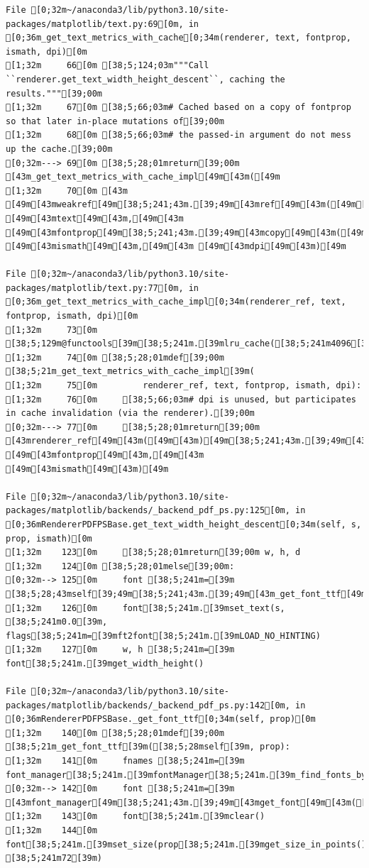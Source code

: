\documentclass[
  letterpaper,
  DIV=11,
  numbers=noendperiod]{scrartcl}
\begin{document}
\begin{verbatim}
File [0;32m~/anaconda3/lib/python3.10/site-packages/matplotlib/text.py:69[0m, in [0;36m_get_text_metrics_with_cache[0;34m(renderer, text, fontprop, ismath, dpi)[0m
[1;32m     66[0m [38;5;124;03m"""Call ``renderer.get_text_width_height_descent``, caching the results."""[39;00m
[1;32m     67[0m [38;5;66;03m# Cached based on a copy of fontprop so that later in-place mutations of[39;00m
[1;32m     68[0m [38;5;66;03m# the passed-in argument do not mess up the cache.[39;00m
[0;32m---> 69[0m [38;5;28;01mreturn[39;00m [43m_get_text_metrics_with_cache_impl[49m[43m([49m
[1;32m     70[0m [43m    [49m[43mweakref[49m[38;5;241;43m.[39;49m[43mref[49m[43m([49m[43mrenderer[49m[43m)[49m[43m,[49m[43m [49m[43mtext[49m[43m,[49m[43m [49m[43mfontprop[49m[38;5;241;43m.[39;49m[43mcopy[49m[43m([49m[43m)[49m[43m,[49m[43m [49m[43mismath[49m[43m,[49m[43m [49m[43mdpi[49m[43m)[49m

File [0;32m~/anaconda3/lib/python3.10/site-packages/matplotlib/text.py:77[0m, in [0;36m_get_text_metrics_with_cache_impl[0;34m(renderer_ref, text, fontprop, ismath, dpi)[0m
[1;32m     73[0m [38;5;129m@functools[39m[38;5;241m.[39mlru_cache([38;5;241m4096[39m)
[1;32m     74[0m [38;5;28;01mdef[39;00m [38;5;21m_get_text_metrics_with_cache_impl[39m(
[1;32m     75[0m         renderer_ref, text, fontprop, ismath, dpi):
[1;32m     76[0m     [38;5;66;03m# dpi is unused, but participates in cache invalidation (via the renderer).[39;00m
[0;32m---> 77[0m     [38;5;28;01mreturn[39;00m [43mrenderer_ref[49m[43m([49m[43m)[49m[38;5;241;43m.[39;49m[43mget_text_width_height_descent[49m[43m([49m[43mtext[49m[43m,[49m[43m [49m[43mfontprop[49m[43m,[49m[43m [49m[43mismath[49m[43m)[49m

File [0;32m~/anaconda3/lib/python3.10/site-packages/matplotlib/backends/_backend_pdf_ps.py:125[0m, in [0;36mRendererPDFPSBase.get_text_width_height_descent[0;34m(self, s, prop, ismath)[0m
[1;32m    123[0m     [38;5;28;01mreturn[39;00m w, h, d
[1;32m    124[0m [38;5;28;01melse[39;00m:
[0;32m--> 125[0m     font [38;5;241m=[39m [38;5;28;43mself[39;49m[38;5;241;43m.[39;49m[43m_get_font_ttf[49m[43m([49m[43mprop[49m[43m)[49m
[1;32m    126[0m     font[38;5;241m.[39mset_text(s, [38;5;241m0.0[39m, flags[38;5;241m=[39mft2font[38;5;241m.[39mLOAD_NO_HINTING)
[1;32m    127[0m     w, h [38;5;241m=[39m font[38;5;241m.[39mget_width_height()

File [0;32m~/anaconda3/lib/python3.10/site-packages/matplotlib/backends/_backend_pdf_ps.py:142[0m, in [0;36mRendererPDFPSBase._get_font_ttf[0;34m(self, prop)[0m
[1;32m    140[0m [38;5;28;01mdef[39;00m [38;5;21m_get_font_ttf[39m([38;5;28mself[39m, prop):
[1;32m    141[0m     fnames [38;5;241m=[39m font_manager[38;5;241m.[39mfontManager[38;5;241m.[39m_find_fonts_by_props(prop)
[0;32m--> 142[0m     font [38;5;241m=[39m [43mfont_manager[49m[38;5;241;43m.[39;49m[43mget_font[49m[43m([49m[43mfnames[49m[43m)[49m
[1;32m    143[0m     font[38;5;241m.[39mclear()
[1;32m    144[0m     font[38;5;241m.[39mset_size(prop[38;5;241m.[39mget_size_in_points(), [38;5;241m72[39m)


\end{verbatim}
\end{document}
